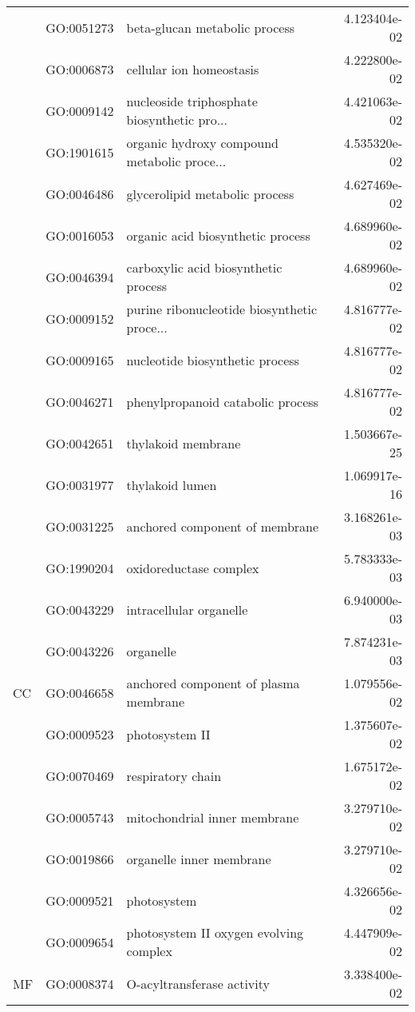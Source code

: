 \begin{longtable}{lllr}
   & GO:0051273 &                beta-glucan metabolic process &  4.123404e-02 \\
   & GO:0006873 &                     cellular ion homeostasis &  4.222800e-02 \\
   & GO:0009142 &  nucleoside triphosphate biosynthetic pro... &  4.421063e-02 \\
   & GO:1901615 &  organic hydroxy compound metabolic proce... &  4.535320e-02 \\
   & GO:0046486 &               glycerolipid metabolic process &  4.627469e-02 \\
   & GO:0016053 &            organic acid biosynthetic process &  4.689960e-02 \\
   & GO:0046394 &         carboxylic acid biosynthetic process &  4.689960e-02 \\
   & GO:0009152 &  purine ribonucleotide biosynthetic proce... &  4.816777e-02 \\
   & GO:0009165 &              nucleotide biosynthetic process &  4.816777e-02 \\
   & GO:0046271 &            phenylpropanoid catabolic process &  4.816777e-02 \\
\cline{1-4}
\multirow{13}{*}{CC} & GO:0042651 &                           thylakoid membrane &  1.503667e-25 \\
   & GO:0031977 &                              thylakoid lumen &  1.069917e-16 \\
   & GO:0031225 &               anchored component of membrane &  3.168261e-03 \\
   & GO:1990204 &                       oxidoreductase complex &  5.783333e-03 \\
   & GO:0043229 &                      intracellular organelle &  6.940000e-03 \\
   & GO:0043226 &                                    organelle &  7.874231e-03 \\
   & GO:0046658 &        anchored component of plasma membrane &  1.079556e-02 \\
   & GO:0009523 &                               photosystem II &  1.375607e-02 \\
   & GO:0070469 &                            respiratory chain &  1.675172e-02 \\
   & GO:0005743 &                 mitochondrial inner membrane &  3.279710e-02 \\
   & GO:0019866 &                     organelle inner membrane &  3.279710e-02 \\
   & GO:0009521 &                                  photosystem &  4.326656e-02 \\
   & GO:0009654 &       photosystem II oxygen evolving complex &  4.447909e-02 \\
\cline{1-4}
MF & GO:0008374 &                   O-acyltransferase activity &  3.338400e-02 \\
\end{longtable}
